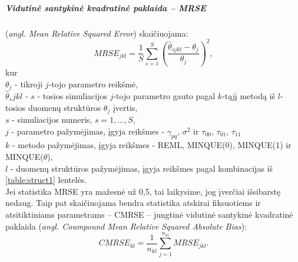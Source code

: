 \documentclass[12pt,a4paper]{article}
\begin{document}
\subparagraph{Vidutinė santykinė kvadratinė paklaida -- MRSE } (\textit{angl.  Mean Relative Squared Error}) skaičiuojama: 
\[
MRSE_{jkl}=\frac{1}{S}\sum_{s=1}^S\left(\frac{\hat{\theta}_{sjkl}-\theta_j}{\theta_j}\right)^2,
\]
kur \\
$\theta_j$ - tikroji $j$-tojo parametro reikšmė, \\
$\hat{\theta}_sjkl$ - $s$ - tosios simuliacijos $j$-tojo parametro gauto pagal $k$-tąjį metodą iš $l$-tosios duomenų struktūros $\theta_j$ įvertis,\\
$s$ - simuliacijos numeris, $s=1,\dots,S$,\\
$j$ - parametro pažymėjimas, įgyja reikšmes - $\gamma_{pq}$, $\sigma^2$ ir $\tau_{00}$,  $\tau_{01}$,  $\tau_{11}$\\
$k$ - metodo pažymėjimas, įgyja reikšmes - REML, MINQUE(0), MINQUE(1) ir MINQUE($\theta$),\\
$l$ - duomenų struktūros pažymėjimas, įgyja reikšmes pagal kombinacijas iš \ref{table:struct1} lentelės.\\
\indent Jei statistika MRSE yra mažesnė už 0,5, tai laikysime, jog įverčiai išsibarstę nedaug. Taip pat skaičiuojama bendra statistika atskirai fiksuotiems ir atsitiktiniams parametrams -- CMRSE -- jungtinė vidutinė santykinė kvadratinė paklaida (\textit{angl. Coumpound Mean Relative Squared Absolute Bias}):
\[
CMRSE_{kl}=\frac{1}{n_{kl}}\sum_{j=1}^{n_{kl}}MRSE_{jkl}.
\]
\end{document}
